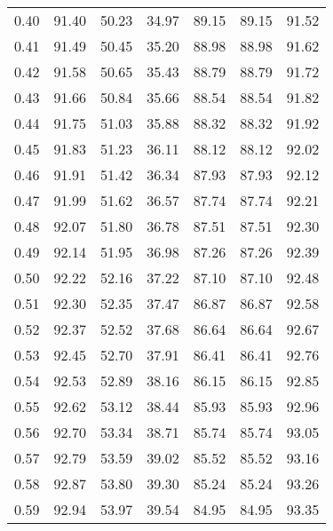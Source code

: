 \begin{tabular}{|c|c|c|c|c|c|c|}
      0.40 &     91.40 &     50.23 &      34.97 &   89.15 &      89.15 &         91.52 \\
      0.41 &     91.49 &     50.45 &      35.20 &   88.98 &      88.98 &         91.62 \\
      0.42 &     91.58 &     50.65 &      35.43 &   88.79 &      88.79 &         91.72 \\
      0.43 &     91.66 &     50.84 &      35.66 &   88.54 &      88.54 &         91.82 \\
      0.44 &     91.75 &     51.03 &      35.88 &   88.32 &      88.32 &         91.92 \\
      0.45 &     91.83 &     51.23 &      36.11 &   88.12 &      88.12 &         92.02 \\
      0.46 &     91.91 &     51.42 &      36.34 &   87.93 &      87.93 &         92.12 \\
      0.47 &     91.99 &     51.62 &      36.57 &   87.74 &      87.74 &         92.21 \\
      0.48 &     92.07 &     51.80 &      36.78 &   87.51 &      87.51 &         92.30 \\
      0.49 &     92.14 &     51.95 &      36.98 &   87.26 &      87.26 &         92.39 \\
      0.50 &     92.22 &     52.16 &      37.22 &   87.10 &      87.10 &         92.48 \\
      0.51 &     92.30 &     52.35 &      37.47 &   86.87 &      86.87 &         92.58 \\
      0.52 &     92.37 &     52.52 &      37.68 &   86.64 &      86.64 &         92.67 \\
      0.53 &     92.45 &     52.70 &      37.91 &   86.41 &      86.41 &         92.76 \\
      0.54 &     92.53 &     52.89 &      38.16 &   86.15 &      86.15 &         92.85 \\
      0.55 &     92.62 &     53.12 &      38.44 &   85.93 &      85.93 &         92.96 \\
      0.56 &     92.70 &     53.34 &      38.71 &   85.74 &      85.74 &         93.05 \\
      0.57 &     92.79 &     53.59 &      39.02 &   85.52 &      85.52 &         93.16 \\
      0.58 &     92.87 &     53.80 &      39.30 &   85.24 &      85.24 &         93.26 \\
      0.59 &     92.94 &     53.97 &      39.54 &   84.95 &      84.95 &         93.35 \\

\end{tabular}
